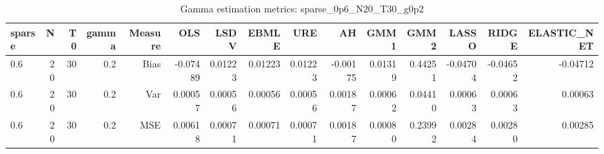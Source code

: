 \begin{table}[!htbp]\centering
\caption{Gamma estimation metrics: sparse_0p6_N20_T30_g0p2}
\label{tab:table1_sparse_0p6_N20_T30_g0p2}
\begin{tabular}{lrrrrrrrrrrrrrr}
\hline
sparse & N & T0 & gamma & Measure & OLS & LSDV & EBMLE & URE & AH & GMM1 & GMM2 & LASSO & RIDGE & ELASTIC_NET \\
\hline
0.6 & 20 & 30 & 0.2 & Bias & -0.07489 & 0.01223 & 0.01223 & 0.01223 & -0.00175 & 0.01319 & 0.44251 & -0.04704 & -0.04652 & -0.04712 \\
0.6 & 20 & 30 & 0.2 & Var & 0.00057 & 0.00056 & 0.00056 & 0.00056 & 0.00187 & 0.00062 & 0.04410 & 0.00063 & 0.00063 & 0.00063 \\
0.6 & 20 & 30 & 0.2 & MSE & 0.00618 & 0.00071 & 0.00071 & 0.00071 & 0.00187 & 0.00080 & 0.23992 & 0.00284 & 0.00280 & 0.00285 \\
\hline
\end{tabular}
\end{table}


